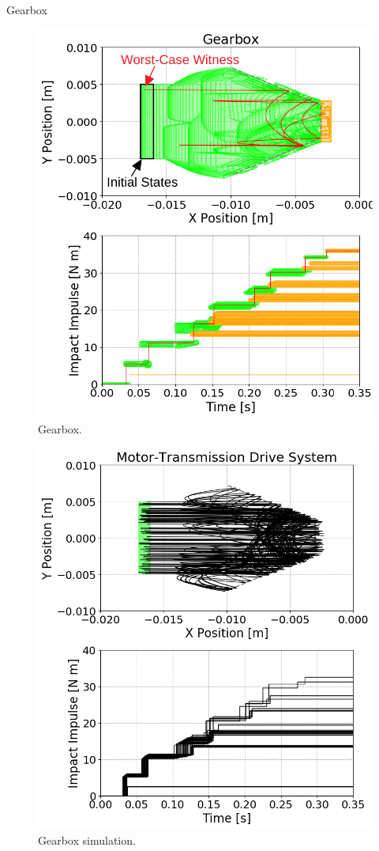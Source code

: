 Gearbox~\cite{chen2014motor}


\begin{figure}[t]
\centerline{\includegraphics[width=0.8\columnwidth]{images/gearbox_annotated}}
\caption{Gearbox.}
\label{fig:chaser}
\end{figure}

\begin{figure}[t]
\centerline{\includegraphics[width=0.8\columnwidth]{images/gearbox_sim.png}}
\caption{Gearbox simulation.}
\label{fig:chaser}
\end{figure}
